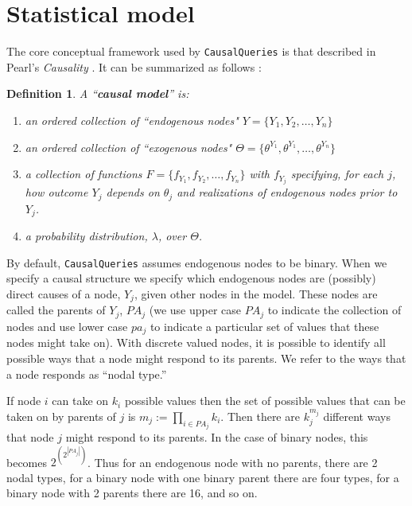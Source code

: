 \documentclass[
  11pt,
  article]{jss}
\newtheorem{definition}{Definition}
\begin{document}
\section{Statistical model}\label{sec-theory}

The core conceptual framework used by \texttt{CausalQueries} is that
described in Pearl's \emph{Causality} \citep{pearl_causality_2009}. It
can be summarized as follows \citep[using notation
from][]{humphreys_integrated_2023}:

\begin{definition}
  
  A ``\textbf{causal model}'' is:
  \begin{enumerate}
    \item an ordered collection of ``endogenous nodes" $Y = \{Y_1, Y_2, \dots, Y_n\}$
    \item an ordered collection of ``exogenous nodes" $\Theta = \{\theta^{Y_1}, \theta^{Y_1}, \dots, \theta^{Y_n}\}$
    \item a collection of functions $F = \{f_{Y_1}, f_{Y_2}, \dots, f_{Y_n}\}$ with $f_{Y_j}$ specifying, for each $j$, how outcome $Y_j$ depends on $\theta_j$ and realizations of endogenous nodes prior to $Y_j$.
    \item a probability distribution, $\lambda$, over $\Theta$.
  \end{enumerate}
  
\end{definition}

By default, \texttt{CausalQueries} assumes endogenous nodes to be
binary. When we specify a causal structure we specify which endogenous
nodes are (possibly) direct causes of a node, \(Y_j\), given other nodes
in the model. These nodes are called the parents of \(Y_j\), \(PA_j\)
(we use upper case \(PA_j\) to indicate the collection of nodes and use
lower case \(pa_j\) to indicate a particular set of values that these
nodes might take on). With discrete valued nodes, it is possible to
identify all possible ways that a node might respond to its parents. We
refer to the ways that a node responds as ``nodal type.''

If node \(i\) can take on \(k_i\) possible values then the set of
possible values that can be taken on by parents of \(j\) is
\(m_j :=\prod_{i\in PA_j}k_i\). Then there are \(k_j^{m_j}\) different
ways that node \(j\) might respond to its parents. In the case of binary
nodes, this becomes \(2^{\left(2^{|PA_j|}\right)}\). Thus for an
endogenous node with no parents, there are 2 nodal types, for a binary
node with one binary parent there are four types, for a binary node with
2 parents there are 16, and so on.
\end{document}
